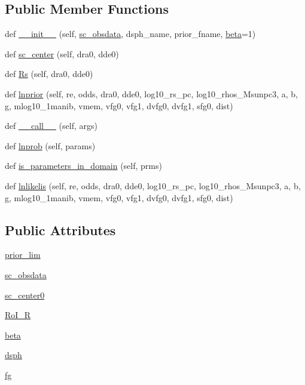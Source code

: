 \subsection*{Public Member Functions}
\begin{DoxyCompactItemize}
\item 
def \hyperlink{class__modKI17_1_1modKI17_a0316df19813ca7e678103de3be2fe354}{\+\_\+\+\_\+init\+\_\+\+\_\+} (self, \hyperlink{class__modKI17_1_1modKI17_af1d0c65f4fe61c625e8b9ffa98b2d0fc}{sc\+\_\+obsdata}, dsph\+\_\+name, prior\+\_\+fname, \hyperlink{class__modKI17_1_1modKI17_af6ac5b5f8bcdf3168ac3d0b6530e512d}{beta}=1)
\item 
def \hyperlink{class__modKI17_1_1modKI17_af5fe9e0c29dd12a9a11e5b00f6fc481e}{sc\+\_\+center} (self, dra0, dde0)
\item 
def \hyperlink{class__modKI17_1_1modKI17_ae2d06ad8467b3c3ba9bcee127044fe53}{Rs} (self, dra0, dde0)
\item 
def \hyperlink{class__modKI17_1_1modKI17_ab0eed42bfb8b4b20979fc9c72ef028e7}{lnprior} (self, re, odds, dra0, dde0, log10\+\_\+rs\+\_\+pc, log10\+\_\+rhos\+\_\+\+Msunpc3, a, b, g, mlog10\+\_\+1manib, vmem, vfg0, vfg1, dvfg0, dvfg1, sfg0, dist)
\item 
def \hyperlink{class__modKI17_1_1modKI17_a20bf807508e322e3920b4bac36a8478a}{\+\_\+\+\_\+call\+\_\+\+\_\+} (self, args)
\item 
def \hyperlink{class__modKI17_1_1modKI17_ab6a04521593f55b09af923b15a60051c}{lnprob} (self, params)
\item 
def \hyperlink{class__modKI17_1_1modKI17_a9df500ff2a922b4ec30f3cfc27b07b6a}{is\+\_\+parameters\+\_\+in\+\_\+domain} (self, prms)
\item 
def \hyperlink{class__modKI17_1_1modKI17_a26cef1b72664426d0186a60a27762932}{lnlikelis} (self, re, odds, dra0, dde0, log10\+\_\+rs\+\_\+pc, log10\+\_\+rhos\+\_\+\+Msunpc3, a, b, g, mlog10\+\_\+1manib, vmem, vfg0, vfg1, dvfg0, dvfg1, sfg0, dist)
\end{DoxyCompactItemize}
\subsection*{Public Attributes}
\begin{DoxyCompactItemize}
\item 
\hyperlink{class__modKI17_1_1modKI17_ac80a8590541a9978d93743ef3188cbc9}{prior\+\_\+lim}
\item 
\hyperlink{class__modKI17_1_1modKI17_af1d0c65f4fe61c625e8b9ffa98b2d0fc}{sc\+\_\+obsdata}
\item 
\hyperlink{class__modKI17_1_1modKI17_a96c663c3da3c43016d5ccc3a374c17bc}{sc\+\_\+center0}
\item 
\hyperlink{class__modKI17_1_1modKI17_a098bb312edc20f21f3f47589a070e278}{Ro\+I\+\_\+R}
\item 
\hyperlink{class__modKI17_1_1modKI17_af6ac5b5f8bcdf3168ac3d0b6530e512d}{beta}
\item 
\hyperlink{class__modKI17_1_1modKI17_ae8ac250ef06bace04d37ca903f91fb65}{dsph}
\item 
\hyperlink{class__modKI17_1_1modKI17_a0c715b875d4d3672f82bc24e0430fcf3}{fg}
\end{DoxyCompactItemize}


